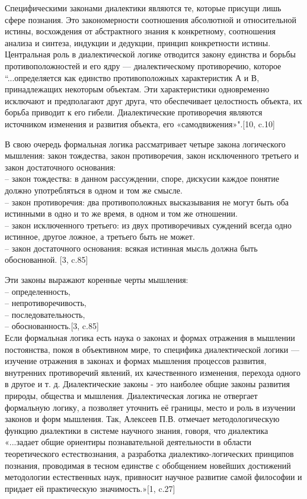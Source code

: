 \documentclass[a4paper,12pt]{report}
\begin{document}
	 Специфическими законами диалектики являются те, которые присущи лишь сфере познания. Это закономерности соотношения абсолютной и относительной истины, восхождения от абстрактного знания к конкретному, соотношения анализа и синтеза, индукции и дедукции, принцип конкретности истины. Центральная роль  в диалектической логике отводится закону единства и борьбы противоположностей и его ядру — диалектическому противоречию, которое   “...определяется как единство противоположных характеристик А и В, принадлежащих некоторым объектам. Эти характеристики одновременно исключают и предполагают друг друга, что обеспечивает целостность объекта, их борьба приводит к его гибели. Диалектические противоречия являются источником изменения и развития объекта, его «самодвижения»".[10, c.10] 

В свою очередь формальная логика рассматривает четыре закона логического мышления: закон тождества, закон противоречия, закон исключенного третьего и закон достаточного основания:\\
 – закон тождества: в данном рассуждении, споре, дискусии каждое понятие должно употребляться в одном и том же смысле.\\
 – закон противоречия: два противоположных высказывания не могут быть оба истинными в одно и то же время, в одном и том же отношении.\\
– закон исключенного третьего: из двух противоречивых суждений всегда одно истинное, другое ложное, а третьего быть не может.\\
– закон достаточного основания: всякая истинная мысль должна быть обоснованной. [3, c.85]

Эти законы выражают коренные черты мышления: \\
\tab – определенность, \\
\tab – непротиворечивость, \\
\tab – последовательность, \\
\tab – обоснованность.[3, c.85]\\

	Если формальная логика есть наука о законах и формах отражения в мышлении постоянства, покоя в объективном мире, то специфика диалектической логики — изучение отражения в законах и формах мышления процессов развития, внутренних противоречий явлений, их качественного изменения, перехода одного в другое и т. д.  Диалектические законы - это наиболее общие законы развития природы, общества и мышления. Диалектическая логика не отвергает формальную логику, а позволяет уточнить её границы, место и роль в изучении законов и форм мышления. Так, Алексеев П.В. отмечает методологическую функцию диалектики в системе научного знания, говоря, что диалектика «...задает общие ориентиры познавательной деятельности в области теоретического естествознания, а разработка диалектико-логических принципов познания, проводимая в тесном единстве с обобщением новейших достижений методологии естественных наук, привносит научное развитие самой философии и придает ей практическую значимость.»[1, c.27] 
\end{document}
